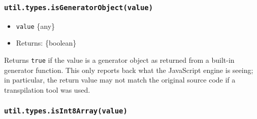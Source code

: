 \begin{Shaded}
\begin{Highlighting}[]
\NormalTok{(} \NormalTok{() \{\})}\OperatorTok{;}  
\NormalTok{(}\OperatorTok{*} \NormalTok{() \{\})}\OperatorTok{;}  
\end{Highlighting}
\end{Shaded}

\subsubsection{\texorpdfstring{\texttt{util.types.isGeneratorObject(value)}}{util.types.isGeneratorObject(value)}}\label{util.types.isgeneratorobjectvalue}

\begin{itemize}
\tightlist
\item
  \texttt{value} \{any\}
\item
  Returns: \{boolean\}
\end{itemize}

Returns \texttt{true} if the value is a generator object as returned
from a built-in generator function. This only reports back what the
JavaScript engine is seeing; in particular, the return value may not
match the original source code if a transpilation tool was used.

\begin{Shaded}
\begin{Highlighting}[]
\OperatorTok{*} \NormalTok{() \{\}}
\OperatorTok{=} \NormalTok{()}\OperatorTok{;}
\OperatorTok{;}  
\end{Highlighting}
\end{Shaded}

\subsubsection{\texorpdfstring{\texttt{util.types.isInt8Array(value)}}{util.types.isInt8Array(value)}}\label{util.types.isint8arrayvalue}


